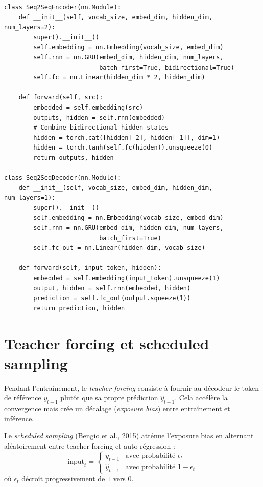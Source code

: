 \begin{codeblock}[title=\textbf{Encodeur-d\'ecodeur Seq2Seq}]
\begin{verbatim}
class Seq2SeqEncoder(nn.Module):
    def __init__(self, vocab_size, embed_dim, hidden_dim, num_layers=2):
        super().__init__()
        self.embedding = nn.Embedding(vocab_size, embed_dim)
        self.rnn = nn.GRU(embed_dim, hidden_dim, num_layers,
                          batch_first=True, bidirectional=True)
        self.fc = nn.Linear(hidden_dim * 2, hidden_dim)

    def forward(self, src):
        embedded = self.embedding(src)
        outputs, hidden = self.rnn(embedded)
        # Combine bidirectional hidden states
        hidden = torch.cat([hidden[-2], hidden[-1]], dim=1)
        hidden = torch.tanh(self.fc(hidden)).unsqueeze(0)
        return outputs, hidden

class Seq2SeqDecoder(nn.Module):
    def __init__(self, vocab_size, embed_dim, hidden_dim, num_layers=1):
        super().__init__()
        self.embedding = nn.Embedding(vocab_size, embed_dim)
        self.rnn = nn.GRU(embed_dim, hidden_dim, num_layers,
                          batch_first=True)
        self.fc_out = nn.Linear(hidden_dim, vocab_size)

    def forward(self, input_token, hidden):
        embedded = self.embedding(input_token).unsqueeze(1)
        output, hidden = self.rnn(embedded, hidden)
        prediction = self.fc_out(output.squeeze(1))
        return prediction, hidden
\end{verbatim}
\end{codeblock}

\section{Teacher forcing et scheduled sampling}
\label{sec:seq:teacher}

\begin{definition}
Pendant l'entra\^inement, le \emph{teacher forcing} consiste \`a fournir au
d\'ecodeur le token de r\'ef\'erence $y_{t-1}$ plut\^ot que sa propre
pr\'ediction $\hat{y}_{t-1}$. Cela acc\'el\`ere la convergence mais cr\'ee
un d\'ecalage (\emph{exposure bias}) entre entra\^inement et inf\'erence.
\end{definition}

\begin{definition}
Le \emph{scheduled sampling} (Bengio et al., 2015) att\'enue l'exposure bias
en alternant al\'eatoirement entre teacher forcing et auto-r\'egression :
\[
\text{input}_t = \begin{cases}
y_{t-1} & \text{avec probabilit\'e } \epsilon_t \\
\hat{y}_{t-1} & \text{avec probabilit\'e } 1 - \epsilon_t
\end{cases}
\]
o\`u $\epsilon_t$ d\'ecro\^it progressivement de $1$ vers $0$.
\end{definition}

